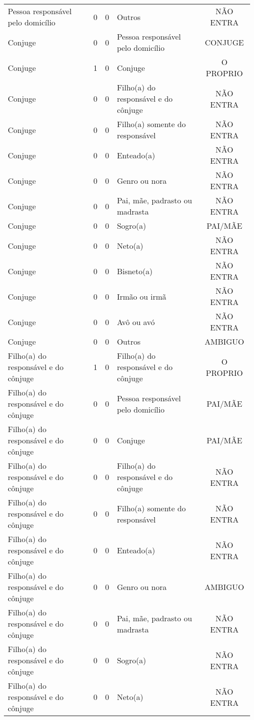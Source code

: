 \documentclass[
	12pt,				%
	openright,			%
	twoside,			%
	a4paper,			%
	english,			%
	french,				%
	spanish,			%
	brazil				%
	]{abntex2}
\begin{document}
\begin{anexosenv}
\begin{longtable}{@{}lcclc@{}}
				Pessoa responsável pelo domicílio & 0 & 0 & Outros & NÃO ENTRA \\
				Conjuge & 0 & 0 & Pessoa responsável pelo domicílio & CONJUGE \\
				Conjuge & 1 & 0 & Conjuge & O PROPRIO \\
				Conjuge & 0 & 0 & Filho(a) do responsável e do cônjuge & NÃO ENTRA \\
				Conjuge & 0 & 0 & Filho(a) somente do responsável & NÃO ENTRA \\
				Conjuge & 0 & 0 & Enteado(a) & NÃO ENTRA \\
				Conjuge & 0 & 0 & Genro ou nora & NÃO ENTRA \\
				Conjuge & 0 & 0 & Pai, mãe, padrasto ou madrasta & NÃO ENTRA \\
				Conjuge & 0 & 0 & Sogro(a) & PAI/MÃE \\
				Conjuge & 0 & 0 & Neto(a) & NÃO ENTRA \\
				Conjuge & 0 & 0 & Bisneto(a) & NÃO ENTRA \\
				Conjuge & 0 & 0 & Irmão ou irmã & NÃO ENTRA \\
				Conjuge & 0 & 0 & Avô ou avó & NÃO ENTRA \\
				Conjuge & 0 & 0 & Outros & AMBIGUO \\
				Filho(a) do responsável e do cônjuge & 1 & 0 & Filho(a) do responsável e do cônjuge & O PROPRIO \\
				Filho(a) do responsável e do cônjuge & 0 & 0 & Pessoa responsável pelo domicílio & PAI/MÃE \\
				Filho(a) do responsável e do cônjuge & 0 & 0 & Conjuge & PAI/MÃE \\
				Filho(a) do responsável e do cônjuge & 0 & 0 & Filho(a) do responsável e do cônjuge & NÃO ENTRA \\
				Filho(a) do responsável e do cônjuge & 0 & 0 & Filho(a) somente do responsável & NÃO ENTRA \\
				Filho(a) do responsável e do cônjuge & 0 & 0 & Enteado(a) & NÃO ENTRA \\
				Filho(a) do responsável e do cônjuge & 0 & 0 & Genro ou nora & AMBIGUO \\
				Filho(a) do responsável e do cônjuge & 0 & 0 & Pai, mãe, padrasto ou madrasta & NÃO ENTRA \\
				Filho(a) do responsável e do cônjuge & 0 & 0 & Sogro(a) & NÃO ENTRA \\
				Filho(a) do responsável e do cônjuge & 0 & 0 & Neto(a) & NÃO ENTRA \\

\end{longtable}
\end{anexosenv}
\end{document}
